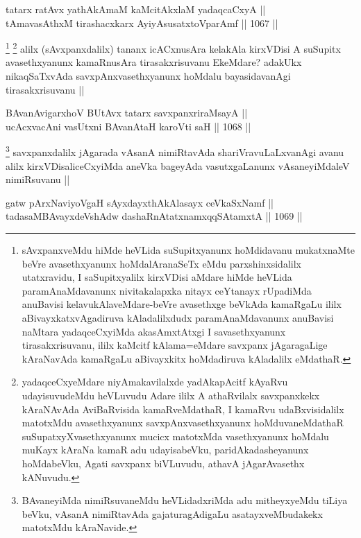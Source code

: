 \begin{shl}
tatarx ratAvx yathAkAmaM kaMcitAkxlaM yadaqcaCxyA || \\
tAmavasAthxM tirashacxkarx AyiyAsusatxtoV\s parAmf ||  1067 ||  
\end{shl}

\begin{artha}
\footnote{sAvxpanxveMdu hiMde heVLida suSupitxyanunx hoMdidavanu mukatxnaMte beVre avasethxyanunx hoMdalAranaSeTx eMdu parxshinxsidalilx utatxravidu, I saSupitxyalilx kirxVDisi aMdare hiMde heVLida paramAnaMdavanunx nivitakalapxka nitayx ceYtanayx rUpadiMda anuBavisi kelavukAlaveMdare-beVre avasethxge beVkAda kamaRgaLu ililx aBivayxkatxvAgadiruva kAladalilxdudx paramAnaMdavanunx anuBavisi naMtara yadaqceCxyiMda akasAmxtAtxgi I savasethxyanunx tirasakxrisuvanu, ililx kaMcitf kAlama=eMdare savxpanx jAgaragaLige kAraNavAda kamaRgaLu aBivayxkitx hoMdadiruva kAladalilx eMdathaR.}
\footnote{yadaqceCxyeMdare niyAmakavilalxde yadAkapAcitf kAyaRvu udayisuvudeMdu heVLuvudu Adare ililx A athaRvilalx savxpanxkekx kAraNAvAda AviBaRvisida kamaRveMdathaR, I kamaRvu udaBxvisidalilx matotxMdu avasethxyanunx savxpAnxvasethxyanunx hoMduvaneMdathaR suSupatxyXvasethxyanunx mucicx matotxMda vasethxyanunx hoMdalu muKayx kAraNa kamaR adu udayisabeVku, paridAkadasheyanunx hoMdabeVku, Agati savxpanx biVLuvudu, athavA jAgarAvasethx kANuvudu.}
alilx (sAvxpanxdalilx) tananx icACxnusAra kelakAla kirxVDisi A suSupitx avasethxyanunx kamaRnusAra tirasakxrisuvanu EkeMdare? adakUkx nikaqSaTxvAda savxpAnxvasethxyanunx hoMdalu bayasidavanAgi tirasakxrisuvanu ||
\end{artha}


\begin{shl}
BAvanAvigarxhoV BUtAvx tatarx savxpanxriraMsayA || \\
ucAcxvacAni vasUtxni BAvanAtaH karoVti saH ||  1068 ||  
\end{shl}

\begin{artha}
\footnote{BAvaneyiMda nimiRsuvaneMdu heVLidadxriMda adu mitheyxyeMdu tiLiya beVku, vAsanA nimiRtavAda gajaturagAdigaLu asatayxveMbudakekx matotxMdu kAraNavide.}
savxpanxdalilx jAgarada vAsanA nimiRtavAda shariVravuLaLxvanAgi avanu alilx kirxVDisaliceCxyiMda aneVka bageyAda vasutxgaLanunx vAsaneyiMdaleV nimiRsuvanu ||
\end{artha}

\begin{shl}
gatw pArxNaviyoVgaH sAyxdayxthAkAlasayx ceVkaSxNamf || \\
tadasaMBAvayxdeVshAdw dashaRnAtatxnamxqqSAtamxtA ||  1069 ||  
\end{shl}

